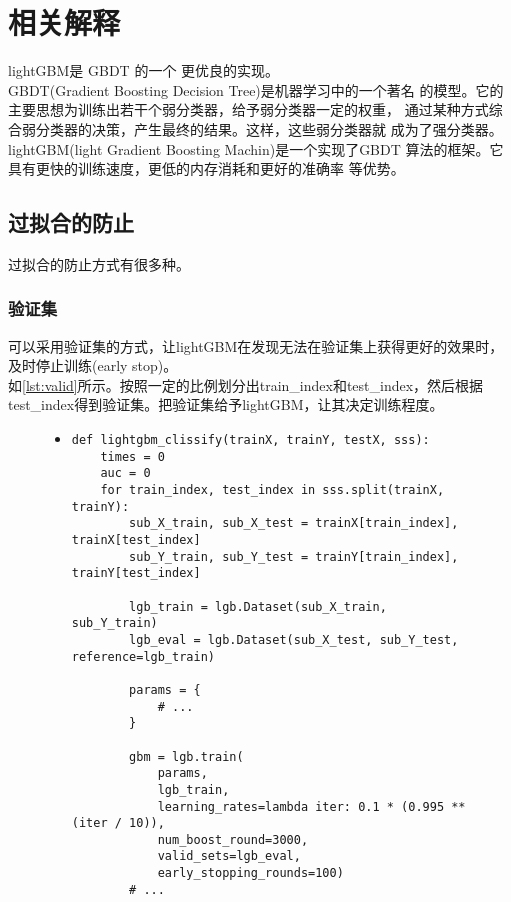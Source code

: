 \documentclass[a4paper]{article}
\begin{document}
\section{相关解释}
lightGBM是 GBDT  的一个
更优良的实现。\\

GBDT(Gradient Boosting Decision Tree)是机器学习中的一个著名
的模型。它的主要思想为训练出若干个弱分类器，给予弱分类器一定的权重，
通过某种方式综合弱分类器的决策，产生最终的结果。这样，这些弱分类器就
成为了强分类器。\\

lightGBM(light Gradient Boosting Machin)是一个实现了GBDT
算法的框架。它具有更快的训练速度，更低的内存消耗和更好的准确率
等优势。
\subsection{过拟合的防止}
过拟合的防止方式有很多种。
\subsubsection{验证集}
可以采用验证集的方式，让lightGBM在发现无法在验证集上获得更好的效果时，及时停止训练(early stop)。\\

如\autoref{lst:valid}所示。按照一定的比例划分出train\_index和test\_index，然后根据
test\_index得到验证集。把验证集给予lightGBM，让其决定训练程度。

\begin{figure}[!hbt]
\begin{itemize}
\item[] \begin{lstlisting}[style=mypython, label=lst:valid, caption=验证集防止过拟合]
def lightgbm_clissify(trainX, trainY, testX, sss):
    times = 0
    auc = 0
    for train_index, test_index in sss.split(trainX, trainY):
        sub_X_train, sub_X_test = trainX[train_index], trainX[test_index]
        sub_Y_train, sub_Y_test = trainY[train_index], trainY[test_index]

        lgb_train = lgb.Dataset(sub_X_train, sub_Y_train)
        lgb_eval = lgb.Dataset(sub_X_test, sub_Y_test, reference=lgb_train)

        params = {
            # ...
        }

        gbm = lgb.train(
            params, 
            lgb_train, 
            learning_rates=lambda iter: 0.1 * (0.995 ** (iter / 10)),
            num_boost_round=3000, 
            valid_sets=lgb_eval, 
            early_stopping_rounds=100)
        # ...
\end{lstlisting}
\end{itemize}
\end{figure}
\end{document}
